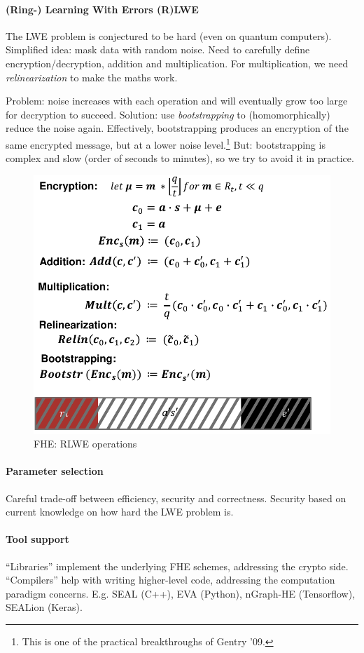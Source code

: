 \paragraph{(Ring-) Learning With Errors (R)LWE}
The LWE problem is conjectured to be hard (even on quantum computers).
Simplified idea: mask data with random noise.
Need to carefully define encryption/decryption, addition and multiplication.
For multiplication, we need \emph{relinearization} to make the maths work.

Problem: noise increases with each operation and will eventually grow too large for decryption to succeed.
Solution: use \emph{bootstrapping} to (homomorphically) reduce the noise again.
Effectively, bootstrapping produces an encryption of the same encrypted message,
but at a lower noise level.\footnote{This is one of the practical breakthroughs of Gentry '09.}
But: bootstrapping is complex and slow (order of seconds to minutes), so we try to avoid it in practice.

\begin{figure}[h]
    \centering
	\includegraphics[scale=0.4]{images/fhe-rlwe.png}
    \caption{FHE: RLWE operations}
    \label{fig:fhe-rlwe}
\end{figure}

\paragraph{Parameter selection}
Careful trade-off between efficiency, security and correctness.
Security based on current knowledge on how hard the LWE problem is.

\paragraph{Tool support}
``Libraries'' implement the underlying FHE schemes, addressing the crypto side.
``Compilers'' help with writing higher-level code, addressing the computation paradigm concerns.
E.g. SEAL (C++), EVA (Python), nGraph-HE (Tensorflow), SEALion (Keras).

